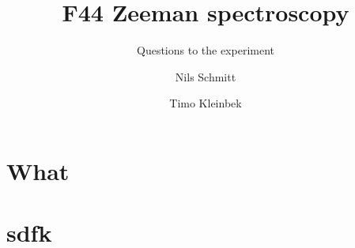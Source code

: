 \documentclass[12pt,
				 a4paper,
				 ]{scrartcl}
\title{F44 Zeeman spectroscopy}
\subtitle{Questions to the experiment}
\author{Nils Schmitt \and Timo Kleinbek}
\date{}
\numberwithin{equation}{section}
\begin{document}
\maketitle
\section*{What}




\section*{sdfk}
\end{document}
